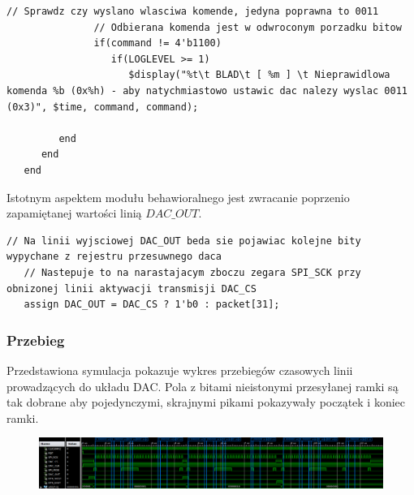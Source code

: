 \documentclass[a4paper,12pt]{article}
\begin{document}
\begin{lstlisting}[label=DacLTC2624Behav,caption=DacLTC2624Behav.v,firstnumber=197]
               // Sprawdz czy wyslano wlasciwa komende, jedyna poprawna to 0011
               // Odbierana komenda jest w odwroconym porzadku bitow
               if(command != 4'b1100)
                  if(LOGLEVEL >= 1)
                     $display("%t\t BLAD\t [ %m ] \t Nieprawidlowa komenda %b (0x%h) - aby natychmiastowo ustawic dac nalezy wyslac 0011 (0x3)", $time, command, command);

         end
      end
   end
\end{lstlisting}

Istotnym aspektem modułu behawioralnego jest zwracanie poprzenio zapamiętanej wartości linią $DAC\_OUT$.
\begin{lstlisting}[label=DacLTC2624Behav,caption=DacLTC2624Behav.v,firstnumber=255]
   // Na linii wyjsciowej DAC_OUT beda sie pojawiac kolejne bity wypychane z rejestru przesuwnego daca
   // Nastepuje to na narastajacym zboczu zegara SPI_SCK przy obnizonej linii aktywacji transmisji DAC_CS
   assign DAC_OUT = DAC_CS ? 1'b0 : packet[31];
\end{lstlisting}

\subsubsection{Przebieg}

Przedstawiona symulacja pokazuje wykres przebiegów czasowych linii prowadzących do układu DAC. Pola z bitami nieistonymi przesyłanej ramki są tak dobrane aby pojedynczymi, skrajnymi pikami pokazywały początek i koniec ramki.

\begin{figure}[htb]
   \centering
   \includegraphics[width=15cm]{grafika/dac_sim.png}
\end{figure}
\end{document}
